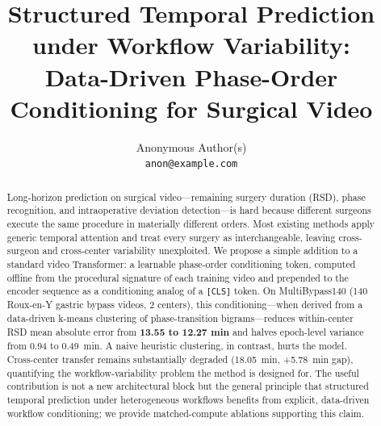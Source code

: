 %

\title{Structured Temporal Prediction under Workflow Variability:\\
Data-Driven Phase-Order Conditioning for Surgical Video}

\author{%
  Anonymous Author(s)\\
  \texttt{anon@example.com}\\
}


\maketitle

\begin{abstract}
  Long-horizon prediction on surgical video—remaining surgery duration (RSD), phase recognition,
  and intraoperative deviation detection—is hard because different surgeons execute the same
  procedure in materially different orders. Most existing methods apply generic temporal attention
  and treat every surgery as interchangeable, leaving cross-surgeon and cross-center variability
  unexploited. We propose a simple addition to a standard video Transformer: a learnable
  phase-order conditioning token, computed offline from the procedural signature of each training
  video and prepended to the encoder sequence as a conditioning analog of a \texttt{[CLS]} token.
  On MultiBypass140 (140 Roux-en-Y gastric bypass videos, 2 centers), this conditioning—when
  derived from a data-driven k-means clustering of phase-transition bigrams—reduces within-center
  RSD mean absolute error from \textbf{13.55 to 12.27 min} and halves epoch-level variance from
  0.94 to 0.49~min. A naive heuristic clustering, in contrast, hurts the model. Cross-center
  transfer remains substantially degraded (18.05~min, +5.78~min gap), quantifying the
  workflow-variability problem the method is designed for. The useful contribution is not a new
  architectural block but the general principle that structured temporal prediction under
  heterogeneous workflows benefits from explicit, data-driven workflow conditioning; we provide
  matched-compute ablations supporting this claim.
\end{abstract}

